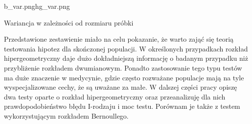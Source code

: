 \begin{diagrams}{b_var.png}{hg_var.png}
	\caption{Wariancja w zależności od rozmiaru próbki}
	\label{var}
\end{diagrams}

Przedstawione zestawienie miało na celu pokazanie, że warto zająć się teorią testowania hipotez dla skończonej populacji. W określonych przypadkach rozkład hipergeometryczny daje dużo dokładniejszą informację o badanym przypadku niż przybliżenie rozkładem dwumianowym. Ponadto zastosowanie tego typu testów ma duże znaczenie w medycynie, gdzie często rozważane populacje mają na tyle wyspecjalizowane cechy, że są uważane za małe. W dalszej części pracy opiszę dwa testy oparte o rozkład hipergeometryczny oraz przeanalizuję dla nich prawdopodobieństwo błędu I-rodzaju i moc testu. Porównam je także z testem wykorzystującym rozkładem Bernoullego.